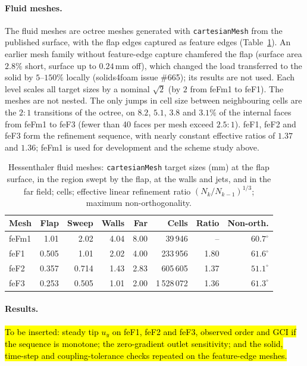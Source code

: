 \paragraph{Fluid meshes.}
The fluid meshes are octree meshes generated with \texttt{cartesianMesh} from the published surface, with the flap edges captured as feature edges (Table~\ref{tab:hessenthaler_meshes}).
An earlier mesh family without feature-edge capture chamfered the flap (surface area $2.8\%$ short, surface up to $0.24\,\mathrm{mm}$ off), which changed the load transferred to the solid by $5$--$150\%$ locally (solids4foam issue \#665); its results are not used.
Each level scales all target sizes by a nominal $\sqrt{2}$ (by $2$ from feFm1 to feF1). The meshes are not nested.
The only jumps in cell size between neighbouring cells are the $2{:}1$ transitions of the octree, on $8.2$, $5.1$, $3.8$ and $3.1\%$ of the internal faces from feFm1 to feF3 (fewer than 40 faces per mesh exceed $2.5{:}1$).
feF1, feF2 and feF3 form the refinement sequence, with nearly constant effective ratios of $1.37$ and $1.36$; feFm1 is used for development and the scheme study above.

\begin{table}[htbp]
	\centering
	\small
	\caption{Hessenthaler fluid meshes: \texttt{cartesianMesh} target sizes (mm) at the flap surface, in the region swept by the flap, at the walls and jets, and in the far field; cells; effective linear refinement ratio $(N_k/N_{k-1})^{1/3}$; maximum non-orthogonality.}
	\label{tab:hessenthaler_meshes}
	\begin{tabular}{lrrrrrrr}
		\toprule
		Mesh & Flap & Sweep & Walls & Far & Cells & Ratio & Non-orth. \\
		\midrule
		feFm1 & 1.01 & 2.02 & 4.04 & 8.00 & 39\,946 & -- & $60.7^\circ$ \\
		feF1 & 0.505 & 1.01 & 2.02 & 4.00 & 233\,956 & 1.80 & $61.6^\circ$ \\
		feF2 & 0.357 & 0.714 & 1.43 & 2.83 & 605\,605 & 1.37 & $51.1^\circ$ \\
		feF3 & 0.253 & 0.505 & 1.01 & 2.00 & 1\,528\,072 & 1.36 & $61.3^\circ$ \\
		\bottomrule
	\end{tabular}
\end{table}

\paragraph{Results.}
\hl{To be inserted: steady tip $u_y$ on feF1, feF2 and feF3, observed order and GCI if the sequence is monotone; the zero-gradient outlet sensitivity; and the solid, time-step and coupling-tolerance checks repeated on the feature-edge meshes.}


